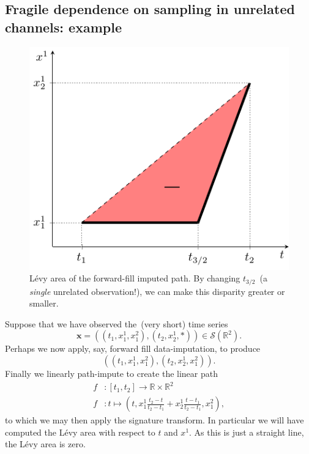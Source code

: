 \documentclass{article}
\newcommand{\reals}{\mathbb{R}}
\newcommand{\seriesspace}{\mathcal{S}}
\begin{document}
\subsection{Fragile dependence on sampling in unrelated channels: example}
\label{sec:Fragile dependence} 

\begin{figure}[t]
    \centering
    \includegraphics[width=0.35 \columnwidth]{figures/sig_path3.pdf}
    \caption{
      L{\'e}vy area of the forward-fill imputed path. By changing
      $t_{3/2}$~(a \emph{single} unrelated observation!), we can make
      this disparity greater or smaller.
    }
    \label{fig:bentline}
\end{figure}

Suppose that we have observed the~(very short) time series
%
\begin{equation}\label{eq:flaw1}
    \mathbf{x} = ((t_1, x_1^1, x_1^2), (t_2, x_2^1, *)) \in \seriesspace(\reals^2).
\end{equation}
%
Perhaps we now apply, say, forward fill data-imputation, to produce
%
\begin{equation*}
    ((t_1, x_1^1, x_1^2), (t_2, x_2^1, x_1^2)).
\end{equation*}
%
Finally we linearly path-impute to create the linear path
%
\begin{align*}
    f &\colon [t_1, t_2] \to \reals \times \reals^2\\
    f &\colon t \mapsto \left(t, x_1^1\frac{t_2 - t}{t_2 - t_1} + x_2^1\frac{t - t_1}{t_2 - t_1}, x_1^2\right),
\end{align*}
%
to which we may then apply the signature transform. In particular we
will have computed the L{\'e}vy area with respect to $t$ and $x^1$. As this
is just a straight line, the L{\'e}vy area is zero.
\end{document}
